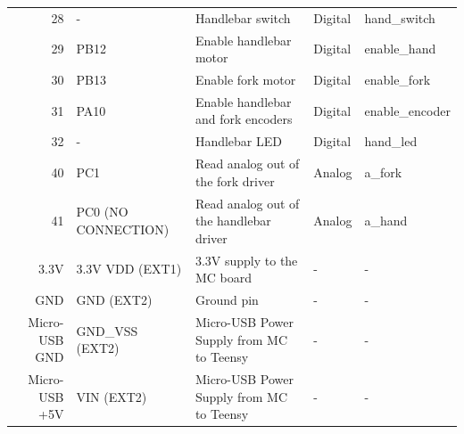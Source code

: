 \begin{table}[h!]
{\begin{tabular}{rllll}
            28            & -                        & Handlebar switch                         & Digital                 & hand\_switch                    \\
            29            & PB12                     & Enable handlebar motor                   & Digital                 & enable\_hand                    \\
            30            & PB13                     & Enable fork motor                        & Digital                 & enable\_fork                    \\
            31            & PA10                     & Enable handlebar and fork encoders       & Digital                 & enable\_encoder                 \\
            32            & -                        & Handlebar LED                            & Digital                 & hand\_led                       \\
            40            & PC1                      & Read analog out of the fork driver       & Analog                  & a\_fork                         \\
            41            & PC0 (NO CONNECTION)      & Read analog out of the handlebar driver  & Analog                  & a\_hand                         \\
            3.3V          & 3.3V VDD (EXT1)          & 3.3V supply to the MC board              & -                       & -                               \\
            GND           & GND (EXT2)               & Ground pin                               & -                       & -                               \\
            Micro-USB GND & GND\_VSS (EXT2)          & Micro-USB Power Supply from MC to Teensy & -                       & -                               \\
            Micro-USB +5V & VIN (EXT2)               & Micro-USB Power Supply from MC to Teensy & -                       & -                               \\
            \bottomrule
        \end{tabular}
    }
    \label{tab:teensy_mc}
\end{table}